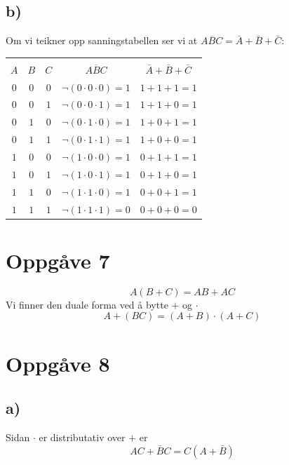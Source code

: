 \documentclass[12pt,a4paper]{article}
\begin{document}
    \subsection{b)}
      Om vi teikner opp sanningstabellen ser vi at $\overline{ABC}=\bar{A}+\bar{B}+\bar{C}$:
      \begin{center}
        \begin{tabular}{ |c|c|c|c|c| }
          \hline
          &&&& \\
          $A$ & $B$ & $C$ & $\overline{ABC}$  & $\bar{A}+\bar{B}+\bar{C}$ \\
          \hline
          $0$ & $0$ & $0$ & $\neg(0\cdot0\cdot0)=1$ & $1+1+1=1$ \\
          \hline
          $0$ & $0$ & $1$ & $\neg(0\cdot0\cdot1)=1$ & $1+1+0=1$ \\
          \hline
          $0$ & $1$ & $0$ & $\neg(0\cdot1\cdot0)=1$ & $1+0+1=1$ \\
          \hline
          $0$ & $1$ & $1$ & $\neg(0\cdot1\cdot1)=1$ & $1+0+0=1$ \\
          \hline
          $1$ & $0$ & $0$ & $\neg(1\cdot0\cdot0)=1$ & $0+1+1=1$ \\
          \hline
          $1$ & $0$ & $1$ & $\neg(1\cdot0\cdot1)=1$ & $0+1+0=1$ \\
          \hline
          $1$ & $1$ & $0$ & $\neg(1\cdot1\cdot0)=1$ & $0+0+1=1$ \\
          \hline
          $1$ & $1$ & $1$ & $\neg(1\cdot1\cdot1)=0$ & $0+0+0=0$ \\
          \hline
        \end{tabular}
      \end{center}

  \section{Oppgåve 7}
    \begin{equation}
      A(B+C)=AB+AC
    \end{equation}
    Vi finner den duale forma ved å bytte $+$ og $\cdot$
    \begin{equation}
      A+(BC)=(A+B)\cdot(A+C)
    \end{equation}
  
  \section{Oppgåve 8}
    \subsection{a)}
      Sidan $\cdot$ er distributativ over $+$ er
      \begin{equation}
        AC+\bar{B}C=C(A+\bar{B})
      \end{equation}
\end{document}
